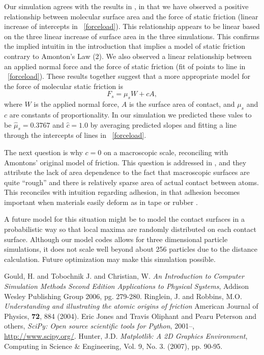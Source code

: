 \documentclass[12pt]{amsart}
\newcommand{\figref}[1]{\figurename~\ref{#1}}
\begin{document}
Our simulation agrees with the results in \cite{ringlein}, in that we have observed a positive relationship between molecular surface area and the force of static friction (linear increase of intercepts in \figref{forceload}). This relationship appears to be linear based on the three linear increase of surface area in the three simulations.  This confirms the implied intuitin in the introduction that implies a model of static friction contrary to Amonton's Law (2).  We also observed a linear relationship between an applied normal force and the force of static friction (fit of points to line in \figref{forceload}). These results together suggest that a more appropriate model for the force of molecular static friction is
$$
  F_s = \mu_s W + c A,
$$ 
where $W$ is the applied normal force,  $A$ is the surface area of contact, and $\mu_s$ and $c$ are constants of proportionality.  In our simulation we predicted these vales to be $\hat \mu_s = 0.3767$ and $\hat c = 1.0$ by averaging predicted slopes and fitting a line through the intercepts of lines in \figref{forceload}.

The next question is why $c = 0$ on a macroscopic scale, reconciling with
Amontons' original model of friction.  This question is addressed in
\cite{ringlein}, and they attribute the lack of area dependence to the fact
that macroscopic surfaces are quite ``rough'' and there is relatively sparse
area of actual contact between atoms.  This reconciles with intuition regarding
adhesion, in that adhesion becomes important when materials easily deform as in tape
or rubber \cite{ringlein}.  

A future model for this situation might
be to model the contact surfaces in a probabilistic way so that local maxima
are randomly distributed on each contact surface.  Although our model codes
allows for three dimensional particle simulations, it does not scale well
beyond about 256 particles due to the distance calculation.  Future
optimization may make this simulation possible.



\begin{thebibliography}{[1]}
   Gould, H. and Tobochnik J. and Christian, W. \emph{An Introduction to Computer Simulation Methods Second Edition Applications to Physical Systems},  Addison Wesley Publishing Group 2006, pg. 279-280.
   Ringlein, J. and Robbins, M.O. \emph{Understanding and illustrating the atomic origins of friction}  American Journal of Physics, {\bf 72}, 884 (2004).
   Eric Jones and Travis Oliphant and Pearu Peterson and others, \emph{{SciPy}: Open source scientific tools for {Python}}, 2001--, \url{http://www.scipy.org/}.
   Hunter, J.D. \emph{Matplotlib: A 2D Graphics Environment}, Computing in Science \& Engineering, Vol. 9, No. 3. (2007), pp. 90-95.
\end{thebibliography}
\end{document}
